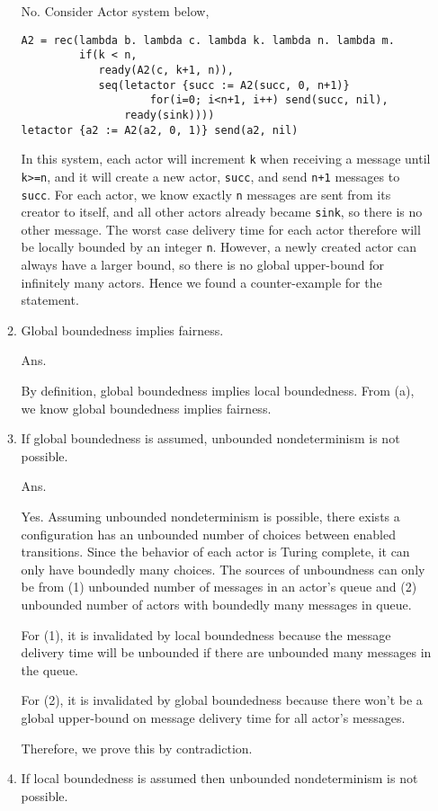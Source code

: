 \documentclass{article}
\begin{document}
\begin{enumerate}
\begin{enumerate}
No. Consider Actor system below,
\begin{verbatim}
A2 = rec(lambda b. lambda c. lambda k. lambda n. lambda m.
         if(k < n,
            ready(A2(c, k+1, n)),
            seq(letactor {succ := A2(succ, 0, n+1)}
                    for(i=0; i<n+1, i++) send(succ, nil),
                ready(sink))))
letactor {a2 := A2(a2, 0, 1)} send(a2, nil)
\end{verbatim}
In this system, each actor will increment \texttt{k} when receiving a message 
until \texttt{k>=n}, and it will create a new actor, \texttt{succ}, and send 
\texttt{n+1} messages to \texttt{succ}. For each actor, we know exactly 
\texttt{n} messages are sent from its creator to itself, and all other actors 
already became \texttt{sink}, so there is no other message. The worst case 
delivery time for each actor therefore will be locally bounded by an integer 
\texttt{n}. However, a newly created actor can always have a larger bound, so 
there is no global upper-bound for infinitely many actors. Hence we found a 
counter-example for the statement.

\item Global boundedness implies fairness.

Ans.

By definition, global boundedness implies local boundedness. From (a), we 
know global boundedness implies fairness.

\item If global boundedness is assumed, unbounded nondeterminism is not
possible.

Ans.

Yes. Assuming unbounded nondeterminism is possible, there exists a 
configuration has an unbounded number of choices between enabled transitions. 
Since the behavior of each actor is Turing complete, it can only have boundedly 
many choices. The sources of unboundness can only be from (1) unbounded number 
of messages in an actor's queue and (2) unbounded number of actors with 
boundedly many messages in queue.

For (1), it is invalidated by local boundedness because the message delivery 
time will be unbounded if there are unbounded many messages in the queue.

For (2), it is invalidated by global boundedness because there won't be a 
global upper-bound on message delivery time for all actor's messages.

Therefore, we prove this by contradiction.

\item If local boundedness is assumed then unbounded nondeterminism is not
possible.


\end{enumerate}
\end{enumerate}
\end{document}
